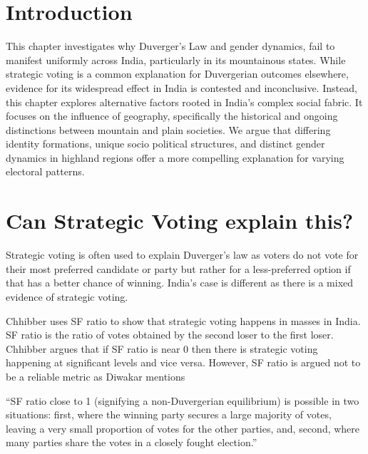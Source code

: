 \section{Introduction}

This chapter investigates why Duverger’s Law and gender dynamics, fail to manifest uniformly across India, particularly in its mountainous states. While strategic voting is a common explanation for Duvergerian outcomes elsewhere, evidence for its widespread effect in India is contested and inconclusive. Instead, this chapter explores alternative factors rooted in India’s complex social fabric. It focuses on the  influence of geography, specifically the historical and ongoing distinctions between mountain and plain societies. We argue that differing identity formations, unique socio political structures, and distinct gender dynamics in highland regions offer a more compelling explanation for varying electoral patterns.


\section{Can Strategic Voting explain this?}

Strategic voting is often used to explain Duverger’s law as voters do not vote for their most preferred candidate or party but rather for a less-preferred option if that has a better chance of winning. India’s case is different as there is a mixed evidence of strategic voting. 

\vspace{0.3cm}

Chhibber uses SF ratio to show that strategic voting happens in masses in India. SF ratio is the ratio of votes obtained by the second loser to the first loser. Chhibber argues that if SF ratio is near 0 then there is strategic voting happening at significant levels and vice versa. However, SF ratio is argued not to be a reliable metric as Diwakar mentions 

\vspace{0.3cm}

“SF ratio close to 1 (signifying a non-Duvergerian equilibrium) is possible in two situations: first, where the winning party secures a large majority of votes, leaving a very small proportion of votes for the other parties, and, second, where many parties share the votes in a closely fought election.”

\vspace{0.3cm}

